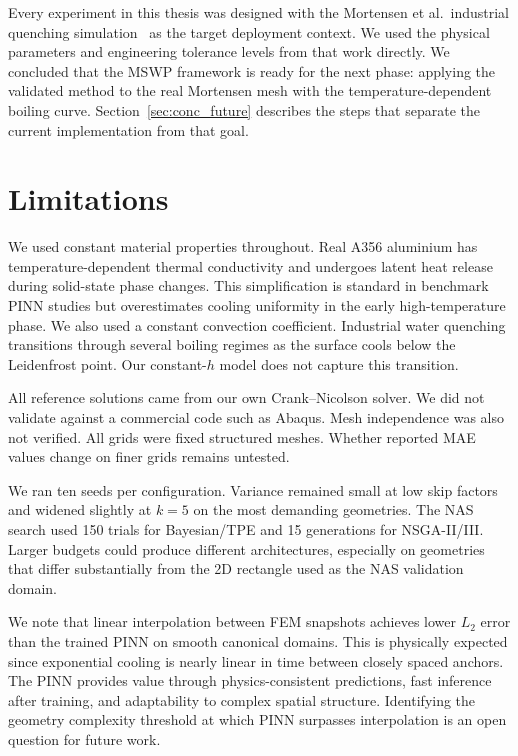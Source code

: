 Every experiment in this thesis was designed with the Mortensen et al.\
industrial quenching simulation~\cite{mortensen2026} as the target deployment
context.
We used the physical parameters and engineering tolerance levels from that work
directly.
We concluded that the MSWP framework is ready for the next phase: applying the
validated method to the real Mortensen mesh with the temperature-dependent
boiling curve.
Section~\ref{sec:conc_future} describes the steps that separate the current
implementation from that goal.

\section{Limitations}
\label{sec:conc_limitations}

We used constant material properties throughout.
Real A356 aluminium has temperature-dependent thermal conductivity and undergoes
latent heat release during solid-state phase changes.
This simplification is standard in benchmark PINN studies but overestimates
cooling uniformity in the early high-temperature phase.
We also used a constant convection coefficient.
Industrial water quenching transitions through several boiling regimes as the
surface cools below the Leidenfrost point.
Our constant-$h$ model does not capture this transition.

All reference solutions came from our own Crank--Nicolson solver.
We did not validate against a commercial code such as Abaqus.
Mesh independence was also not verified.
All grids were fixed structured meshes.
Whether reported MAE values change on finer grids remains untested.

We ran ten seeds per configuration.
Variance remained small at low skip factors and widened slightly at $k=5$ on
the most demanding geometries.
The NAS search used 150 trials for Bayesian/TPE and 15 generations for
NSGA-II/III.
Larger budgets could produce different architectures, especially on geometries
that differ substantially from the 2D rectangle used as the NAS validation domain.

We note that linear interpolation between FEM snapshots achieves lower $L_2$
error than the trained PINN on smooth canonical domains.
This is physically expected since exponential cooling is nearly linear in time
between closely spaced anchors.
The PINN provides value through physics-consistent predictions, fast inference
after training, and adaptability to complex spatial structure.
Identifying the geometry complexity threshold at which PINN surpasses
interpolation is an open question for future work.

